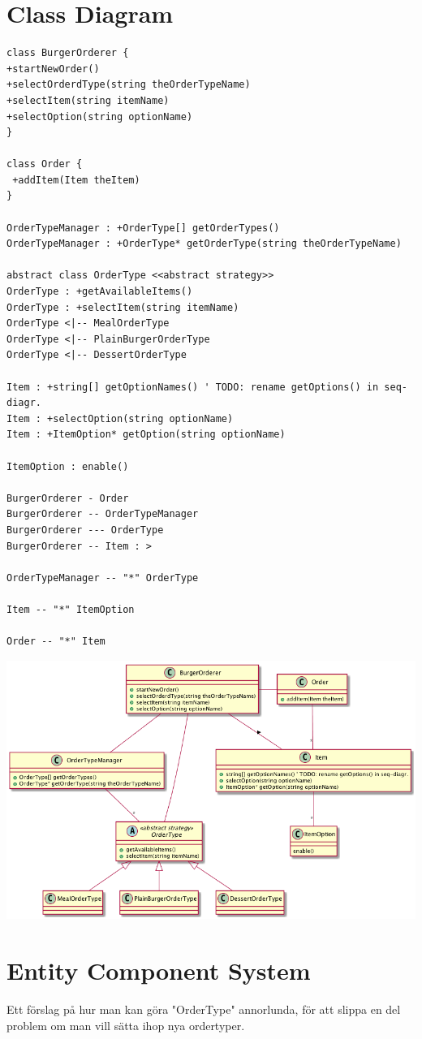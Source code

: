 \documentclass[11pt]{article}
\begin{document}
\section{Class Diagram}
\label{sec:orgaa76282}
\begin{verbatim}
class BurgerOrderer {
+startNewOrder()
+selectOrderdType(string theOrderTypeName)
+selectItem(string itemName)
+selectOption(string optionName)
}

class Order {
 +addItem(Item theItem)
}

OrderTypeManager : +OrderType[] getOrderTypes()
OrderTypeManager : +OrderType* getOrderType(string theOrderTypeName)

abstract class OrderType <<abstract strategy>>
OrderType : +getAvailableItems()
OrderType : +selectItem(string itemName)
OrderType <|-- MealOrderType
OrderType <|-- PlainBurgerOrderType
OrderType <|-- DessertOrderType

Item : +string[] getOptionNames() ' TODO: rename getOptions() in seq-diagr.
Item : +selectOption(string optionName)
Item : +ItemOption* getOption(string optionName)

ItemOption : enable()

BurgerOrderer - Order
BurgerOrderer -- OrderTypeManager
BurgerOrderer --- OrderType
BurgerOrderer -- Item : >

OrderTypeManager -- "*" OrderType

Item -- "*" ItemOption

Order -- "*" Item

\end{verbatim}

\begin{center}
\includegraphics[width=.9\linewidth]{202004-classes.png}
\end{center}

\section{Entity Component System}
\label{sec:org594d5b3}
Ett förslag på hur man kan göra "OrderType" annorlunda, för att slippa en del problem om man vill sätta ihop nya ordertyper.
\end{document}
